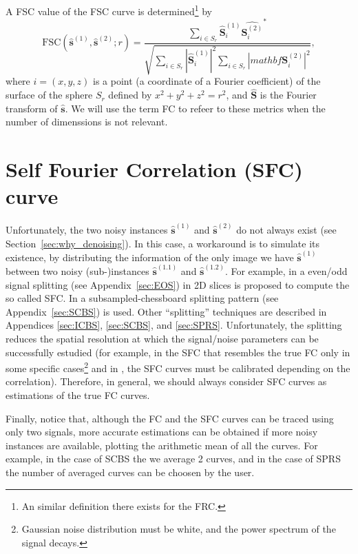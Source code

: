 A FSC value of the FSC curve is determined\footnote{An similar
  definition there exists for the FRC.} by~\cite{verbeke2024self}
\begin{equation}
  \text{FSC}(\hat{\mathbf{s}}^{(1)}, \hat{\mathbf{s}}^{(2)}; r) = \frac{\sum_{i \in S_r} \hat{\mathbf{S}}^{(1)}_i \hat{{\mathbf{S}}^{(2)}_i}^*}{\sqrt{\sum_{i \in S_r} |\hat{\mathbf{S}}^{(1)}_i|^2 \sum_{i \in S_r} |mathbf{\mathbf{S}}^{(2)}_i|^2}},
  \label{eq:FSC}
\end{equation}
where $i=(x, y, z)$ is a point (a coordinate of a Fourier coefficient)
of the surface of the sphere $S_r$ defined by $x^2+y^2+z^2=r^2$, and
$\hat{\mathbf{S}}$ is the Fourier transform of $\hat{\mathbf{s}}$. We
will use the term \gls{FC} to refeer to these metrics when the number
of dimenssions is not relevant.


\section{Self Fourier Correlation (SFC) curve}

Unfortunately, the two noisy instances $\hat{\mathbf{s}}^{(1)}$ and
$\hat{\mathbf{s}}^{(2)}$ do not always exist (see
Section~\ref{sec:why_denoising}).  In this case, a workaround is to
simulate its existence, by distributing the information of the only
image we have $\hat{\mathbf{s}}^{(1)}$ between two noisy
(sub-)instances $\hat{\mathbf{s}}^{(1.1)}$ and
$\hat{\mathbf{s}}^{(1.2)}$. For example, in \cite{verbeke2024self} a
even/odd signal splitting (see Appendix~\ref{sec:EOS}) in 2D slices is
proposed to compute the so called \gls{SFC}. In \cite{koho2019fourier}
a subsampled-chessboard splitting pattern (see
Appendix~\ref{sec:SCBS}) is used. Other ``splitting'' techniques are
described in Appendices \ref{sec:ICBS}, \ref{sec:SCBS}, and
\ref{sec:SPRS}. Unfortunately, the splitting reduces the spatial
resolution at which the signal/noise parameters can be successfully
estudied (for example, in \cite{verbeke2024self} the \gls{SFC} that
resembles the true \gls{FC} only in some specific cases\footnote{Gaussian
  noise distribution must be white, and the power spectrum of the
  signal decays.} and in \cite{koho2019fourier}, the \gls{SFC} curves
must be calibrated depending on the correlation). Therefore, in
general, we should always consider \gls{SFC} curves as estimations of
the true \gls{FC} curves.

Finally, notice that, although the \gls{FC} and the \gls{SFC} curves
can be traced using only two signals, more accurate estimations can be
obtained if more noisy instances are available, plotting the arithmetic mean
of all the curves. For example, in the case of SCBS the we average 2
curves, and in the case of SPRS the number of averaged curves can be
choosen by the user.


